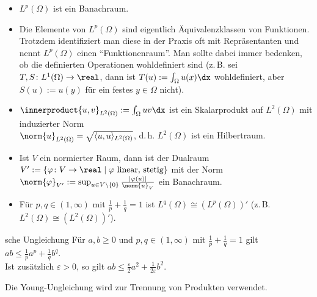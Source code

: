 \begin{Bem}
    \begin{itemize}
        \item
        $L^p(\Omega)$ ist ein Banachraum.

        \item
        Die Elemente von $L^p(\Omega)$ sind eigentlich Äquivalenzklassen von Funktionen.
        Trotzdem identifiziert man diese in der Praxis oft mit Repräsentanten und nennt
        $L^p(\Omega)$ einen "`Funktionenraum"'.
        Man sollte dabei immer bedenken, ob die definierten Operationen wohldefiniert sind
        (z.\,B. sei $T, S\colon L^1(\Omega) \to \real$,
        dann ist $T(u) := \int_\Omega u(x) \dx$ wohldefiniert,
        aber $S(u) := u(y)$ für ein festes $y \in \Omega$ nicht).

        \item
        $\innerproduct{u, v}_{L^2(\Omega)} := \int_\Omega uv \dx$ ist ein Skalarprodukt auf
        $L^2(\Omega)$ mit induzierter Norm\\
        $\norm{u}_{L^2(\Omega)} = \sqrt{\langle u, u \rangle_{L^2(\Omega)}}$,
        d.\,h. $L^2(\Omega)$ ist ein Hilbertraum.

        \item
        Ist $V$ ein normierter Raum, dann ist der Dualraum
        $V' := \{\varphi\colon V \to \real \;|\; \text{$\varphi$ linear, stetig}\}$
        mit der Norm
        $\norm{\varphi}_{V'} := \sup_{u \in V \setminus \{0\}} \frac{|\varphi(u)|}{\norm{u}_V}$
        ein Banachraum.

        \item
        Für $p, q \in (1, \infty)$ mit $\frac{1}{p} + \frac{1}{q} = 1$ ist
        $L^q(\Omega) \cong (L^p(\Omega))'$
        (z.\,B. $L^2(\Omega) \cong (L^2(\Omega))'$).
    \end{itemize}
\end{Bem}

\linie

\begin{Satz}{sche Ungleichung}
    Für $a, b \ge 0$ und $p, q \in (1, \infty)$ mit $\frac{1}{p} + \frac{1}{q} = 1$ gilt
    $ab \le \frac{1}{p} a^p + \frac{1}{q} b^q$.\\
    Ist zusätzlich $\varepsilon > 0$, so gilt
    $ab \le \frac{\varepsilon}{2} a^2 + \frac{1}{2\varepsilon} b^2$.
\end{Satz}

\begin{Bem}
    Die Young-Ungleichung wird zur Trennung von Produkten verwendet.
\end{Bem}

